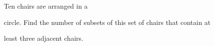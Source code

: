 Ten chairs are arranged in a 

circle. Find the number of subsets of this set of chairs that contain at

 least three adjacent chairs.